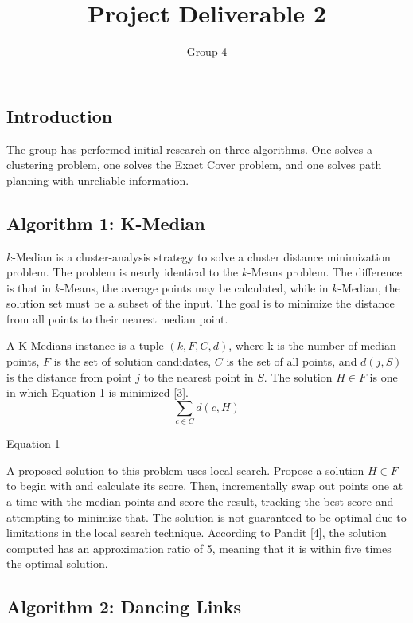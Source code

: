 \documentclass[11pt]{article}
\title{Project Deliverable 2}
\author{Group 4}
\date{}
\begin{document}
\maketitle

\subsection*{Introduction}

The group has performed initial research on three algorithms. One solves a clustering problem, one solves the Exact Cover problem, and one solves path planning with unreliable information.

\subsection*{Algorithm 1: K-Median}

$k$-Median is a cluster-analysis strategy to solve a cluster distance minimization problem. The problem is nearly identical to the $k$-Means problem. The difference is that in $k$-Means, the average points may be calculated, while in $k$-Median, the solution set must be a subset of the input. The goal is to minimize the distance from all points to their nearest median point.

A K-Medians instance is a tuple $(k,F,C,d)$, where k is the number of median points, $F$ is the set of solution candidates, $C$ is the set of all points, and $d(j,S)$ is the distance from point $j$ to the nearest point in $S$. The solution $H \in F$ is one in which Equation 1 is minimized [3].
$$\sum_{c \in C} d(c,H)$$
\begin{center}
    Equation 1
\end{center}

A proposed solution to this problem uses local search. Propose a solution $H \in F$ to begin with and calculate its score. Then, incrementally swap out points one at a time with the median points and score the result, tracking the best score and attempting to minimize that. The solution is not guaranteed to be optimal due to limitations in the local search technique. According to Pandit [4], the solution computed has an approximation ratio of 5, meaning that it is within five times the optimal solution.

\subsection*{Algorithm 2: Dancing Links}
\end{document}
